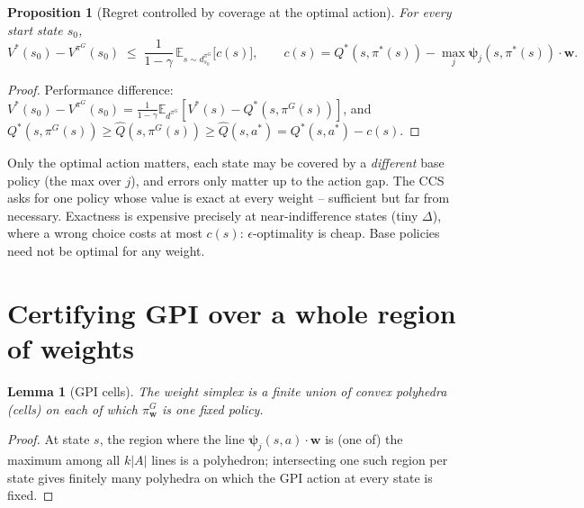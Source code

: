 \documentclass[11pt]{article}
\newcommand{\vpsi}{\bm{\psi}}
\newcommand{\w}{\mathbf{w}}
\newtheorem{proposition}{Proposition}
\newtheorem{lemma}{Lemma}
\begin{document}
\begin{proposition}[Regret controlled by coverage at the optimal action]\label{prop:cov}
For every start state $s_0$,
\[ V^*(s_0)-V^{\pi^G}(s_0)\;\le\;\frac{1}{1-\gamma}\,\mathbb E_{s\sim d^{\pi^G}_{s_0}}\big[c(s)\big],
\qquad c(s)=Q^*(s,\pi^*(s))-\max_j\vpsi_j(s,\pi^*(s))\cdot\w .\]
\end{proposition}
\begin{proof}
Performance difference: $V^*(s_0)-V^{\pi^G}(s_0)=\frac{1}{1-\gamma}\mathbb E_{d^{\pi^G}}[V^*(s)-Q^*(s,\pi^G(s))]$,
and $Q^*(s,\pi^G(s))\ge\hat Q(s,\pi^G(s))\ge \hat Q(s,a^*)=Q^*(s,a^*)-c(s)$.
\end{proof}

\noindent
Only the optimal action matters, each state may be covered by a \emph{different} base policy (the max over
$j$), and errors only matter up to the action gap. The CCS asks for one policy whose value is exact at every
weight -- sufficient but far from necessary. Exactness is expensive precisely at near-indifference states
(tiny $\Delta$), where a wrong choice costs at most $c(s)$: $\epsilon$-optimality is cheap. Base policies
need not be optimal for any weight.

\section{Certifying GPI over a whole region of weights}

\begin{lemma}[GPI cells]
The weight simplex is a finite union of convex polyhedra (cells) on each of which $\pi^G_\w$ is one fixed
policy.
\end{lemma}
\begin{proof}
At state $s$, the region where the line $\vpsi_j(s,a)\cdot\w$ is (one of) the maximum among all $k|A|$
lines is a polyhedron; intersecting one such region per state gives finitely many polyhedra on which the
GPI action at every state is fixed.
\end{proof}
\end{document}
